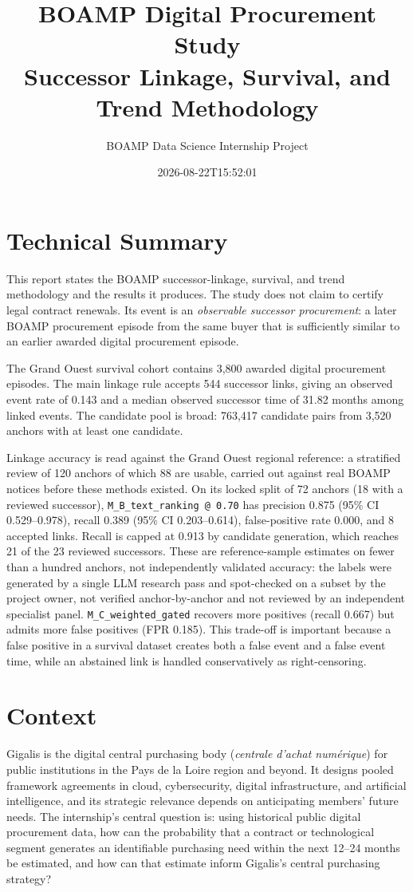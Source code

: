 \documentclass[11pt,a4paper]{article}
\title{BOAMP Digital Procurement Study\\\large Successor Linkage, Survival, and Trend Methodology}
\author{BOAMP Data Science Internship Project}
\date{2026-08-22T15:52:01}
\newcommand{\code}[1]{\texttt{#1}}
\begin{document}
\sloppy
\maketitle
\tableofcontents
\newpage

\section*{Technical Summary}
This report states the BOAMP successor-linkage, survival, and trend methodology
and the results it produces. The study does not claim to certify legal contract
renewals. Its event is an \emph{observable successor procurement}: a later BOAMP
procurement episode from the same buyer that is sufficiently similar to an
earlier awarded digital procurement episode.

The Grand Ouest survival cohort contains
3,800 awarded digital procurement episodes.
The main linkage rule accepts 544
successor links, giving an observed event rate of
0.143 and a median observed successor
time of 31.82
months among linked events. The candidate pool is broad:
763,417 candidate pairs from
3,520 anchors with at least one candidate.

Linkage accuracy is read against the Grand Ouest regional reference: a
stratified review of 120 anchors of which 88 are
usable, carried out against real BOAMP notices before these methods existed. On
its locked split of 72 anchors
(18 with a reviewed successor),
\code{M\_B\_text\_ranking @ 0.70} has precision 0.875
(95\% CI 0.529--0.978), recall
0.389 (95\% CI 0.203--0.614),
false-positive rate 0.000, and 8 accepted links.
Recall is capped at 0.913 by
candidate generation, which reaches
21 of the
23 reviewed successors.
These are reference-sample estimates on fewer than a hundred anchors, not
independently validated accuracy: the labels were generated by a single LLM
research pass and spot-checked on a subset by the project owner, not verified
anchor-by-anchor and not reviewed by an independent specialist panel.
\code{M\_C\_weighted\_gated} recovers more positives
(recall 0.667) but admits more false positives
(FPR 0.185). This trade-off is important because a false positive in a
survival dataset creates both a false event and a false event time, while an
abstained link is handled conservatively as right-censoring.

\section{Context}
Gigalis is the digital central purchasing body (\emph{centrale d'achat
num\'erique}) for public institutions in the Pays de la Loire region and beyond.
It designs pooled framework agreements in cloud, cybersecurity, digital
infrastructure, and artificial intelligence, and its strategic relevance depends
on anticipating members' future needs. The internship's central question is:
using historical public digital procurement data, how can the probability that a
contract or technological segment generates an identifiable purchasing need
within the next 12--24 months be estimated, and how can that estimate inform
Gigalis's central purchasing strategy?
\end{document}
